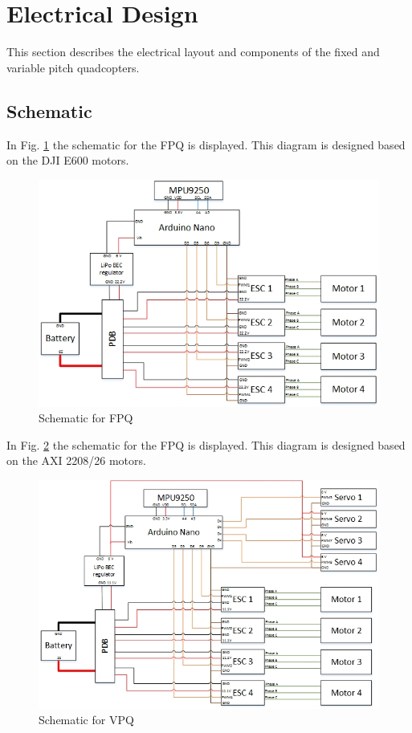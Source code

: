 \section{Electrical Design}
This section describes the electrical layout and components of the fixed and variable pitch quadcopters.

\subsection{Schematic}
In Fig. \ref{fig:fpqsch} the schematic for the FPQ is displayed. This diagram is designed based on the DJI E600 motors. 
\begin{figure}[H]
    \centering
    \includegraphics[width = 1\textwidth]{VAPIQ-PICTURES/ShematicFPQ}
    \caption{Schematic for FPQ}
    \label{fig:fpqsch}
\end{figure}
\newpage
\noindent
In Fig. \ref{fig:vpqsch} the schematic for the FPQ is displayed. This diagram is designed based on the AXI 2208/26 motors. 
\begin{figure}[H]
    \centering
    \includegraphics[width = 1\textwidth]{VAPIQ-PICTURES/ShematicVPQ}
    \caption{Schematic for VPQ}
    \label{fig:vpqsch}
\end{figure}
\newpage
